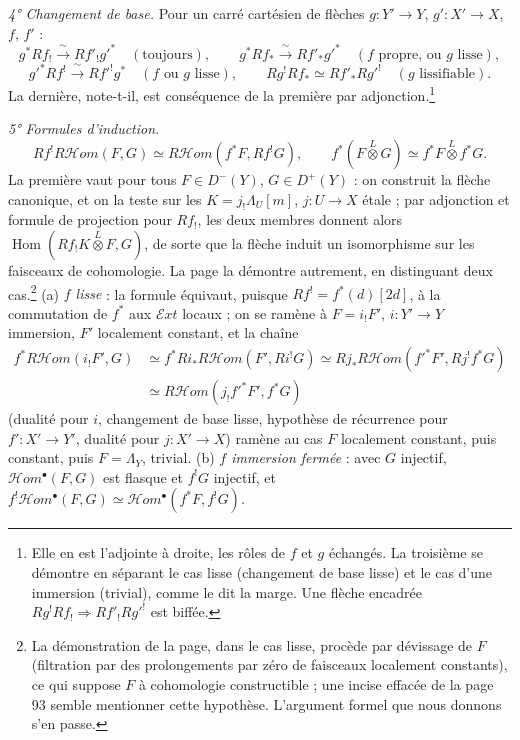 \documentclass[11pt,a4paper]{article}
\begin{document}
\emph{4° Changement de base.} Pour un carré cartésien de flèches $g : Y' \to Y$,
$g' : X' \to X$, $f$, $f'$ :
\[
  g^{*}Rf_{!} \xrightarrow{\ \sim\ } Rf'_{!}g'^{*} \quad (\text{toujours}),
  \qquad g^{*}Rf_{*} \xrightarrow{\ \sim\ } Rf'_{*}g'^{*} \quad
  (f \text{ propre, ou } g \text{ lisse}),
\]
\[
  g'^{*}Rf^{!} \xrightarrow{\ \sim\ } Rf'^{!}g^{*} \quad (f \text{ ou } g
  \text{ lisse}), \qquad Rg^{!}Rf_{*} \simeq Rf'_{*}Rg'^{!} \quad (g \text{ lissifiable}).
\]
La dernière, note-t-il, est conséquence de la première par
adjonction.\footnote{Elle en est l'adjointe à droite, les rôles de $f$ et $g$
échangés. La troisième se démontre en séparant le cas lisse (changement de base
lisse) et le cas d'une immersion (trivial), comme le dit la marge. Une flèche
encadrée $Rg^{!}Rf_{!} \Rightarrow Rf'_{!}Rg'^{!}$ est biffée.}

\emph{5° Formules d'induction.}
\[
  Rf^{!}R\mathcal{H}om(F, G) \simeq R\mathcal{H}om(f^{*}F, Rf^{!}G), \qquad
  f^{*}(F \overset{L}{\otimes} G) \simeq f^{*}F \overset{L}{\otimes} f^{*}G.
\]
La première vaut pour tous $F \in D^{-}(Y)$, $G \in D^{+}(Y)$ : on construit
la flèche canonique, et on la teste sur les $K = j_{!}\Lambda_{U}[m]$, $j : U
\to X$ étale ; par adjonction et formule de projection pour $Rf_{!}$, les deux
membres donnent alors $\operatorname{Hom}(Rf_{!}K \overset{L}{\otimes} F,
G)$, de sorte que la flèche induit un isomorphisme sur les faisceaux de
cohomologie. La
page la démontre autrement, en distinguant deux cas.\footnote{La démonstration
de la page, dans le cas lisse, procède par dévissage de $F$ (filtration par des
prolongements par zéro de faisceaux localement constants), ce qui suppose $F$
à cohomologie constructible ; une incise effacée de la page 93 semble
mentionner cette hypothèse. L'argument formel que nous donnons s'en passe.}
(a) \emph{$f$ lisse} : la formule équivaut, puisque $Rf^{!} = f^{*}(d)[2d]$, à
la commutation de $f^{*}$ aux $\mathcal{E}xt$ locaux ; on se ramène à $F =
i_{!}F'$, $i : Y' \to Y$ immersion, $F'$ localement constant, et la chaîne
\begin{align*}
  f^{*}R\mathcal{H}om(i_{!}F', G) &\simeq f^{*}Ri_{*}R\mathcal{H}om(F', Ri^{!}G)
  \simeq Rj_{*}R\mathcal{H}om(f'^{*}F', Rj^{!}f^{*}G) \\
  &\simeq R\mathcal{H}om(j_{!}f'^{*}F', f^{*}G)
\end{align*}
(dualité pour $i$, changement de base lisse, hypothèse de récurrence pour
$f' : X' \to Y'$, dualité pour $j : X' \to X$) ramène au cas $F$ localement
constant, puis constant, puis $F = \Lambda_{Y}$, trivial. (b) \emph{$f$ immersion
fermée} : avec $G$ injectif, $\mathcal{H}om^{\bullet}(F, G)$ est flasque et
$f^{!}G$ injectif, et $f^{!}\mathcal{H}om^{\bullet}(F, G) \simeq
\mathcal{H}om^{\bullet}(f^{*}F, f^{!}G)$.
\end{document}
